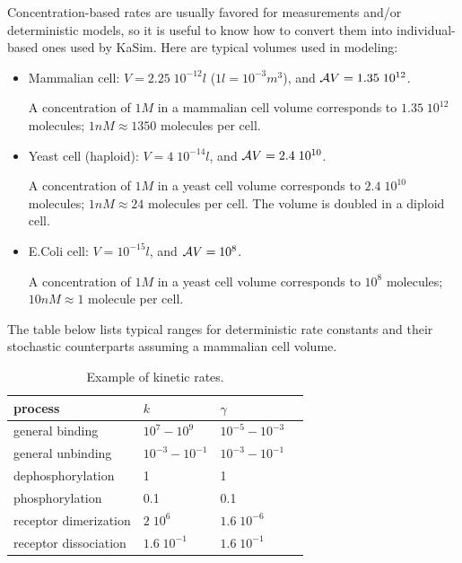 \documentclass[11pt]{book}
\begin{document}
Concentration-based rates are usually favored for measurements and/or deterministic models, so it is useful to know how to convert them into
individual-based ones used by KaSim.
Here are typical volumes used in modeling:
\begin{itemize}
\item Mammalian cell: $V=2.25\; 10^{-12}l$  ($1l=10^{-3}m^3$), and ${\cal A}V=1.35\; 10^{12}$.

A concentration of $1M$ in a mammalian cell volume corresponds to $1.35\; 10^{12}$ molecules; $1nM\approx 1350$ molecules per cell.

\item
Yeast cell (haploid): $V=4\; 10^{-14}l$, and ${\cal A}V=2.4\; 10^{10}$.

A concentration of $1M$ in a yeast cell volume corresponds to $2.4\; 10^{10}$ molecules; $1nM\approx 24$ molecules per cell. The volume is doubled in a diploid cell.
\item
E.\@ Coli cell: $V=10^{-15}l$, and ${\cal A}V=10^{8}$.

A concentration of $1M$ in a yeast cell volume corresponds to $10^{8}$ molecules; $10nM\approx 1$ molecule per cell.
\end{itemize}

The table below lists typical ranges for deterministic rate constants and
their stochastic counterparts assuming a mammalian cell volume.

\begin{table}[htbp]
\centering
\caption{Example of kinetic rates.}
\begin{tabular}{@{} lllr @{} }
\toprule
process & $k$ & $\gamma$ %
\\
\midrule
general binding & $10^{7}-10^{9}$ & $10^{-5}-10^{-3}$ %
\\
general unbinding &  $10^{-3} - 10^{-1}$ & $10^{-3}-10^{-1}$ %
\\
dephosphorylation & 1 & 1 %
\\
phosphorylation & 0.1 & 0.1 %
\\
receptor dimerization & $2\; 10^{6}$ & $1.6 \;10^{-6}$ %
\\
receptor dissociation & $1.6\; 10^{-1}$ & $1.6\; 10^{-1}$ %
\\
\bottomrule
\end{tabular}
\end{table}
\end{document}
